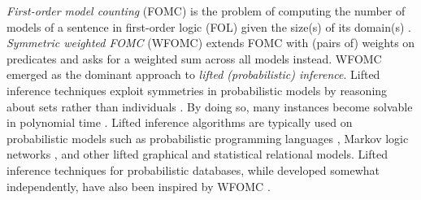 \documentclass[letterpaper]{article} %
\theoremstyle{definition}
\theoremstyle{remark}
\begin{document}
\emph{First-order model counting} (FOMC) is the problem of computing the number
of models of a sentence in first-order logic (FOL) given the size(s) of its
domain(s) \citep{DBLP:conf/pods/BeameBGS15}. \emph{Symmetric weighted FOMC}
(WFOMC) extends FOMC with (pairs of) weights on predicates and asks for a
weighted sum across all models instead. WFOMC emerged as the dominant approach
to \emph{lifted (probabilistic) inference}. Lifted inference techniques exploit
symmetries in probabilistic models by reasoning about sets rather than
individuals \citep{DBLP:conf/ecai/Kersting12}. By doing so, many instances
become solvable in polynomial time \citep{DBLP:conf/nips/Broeck11}. Lifted
inference algorithms are typically used on probabilistic models such as
probabilistic programming languages
\citep{DBLP:journals/ml/RaedtK15,DBLP:journals/ijar/RiguzziBZCL17}, Markov logic
networks
\citep{DBLP:conf/ijcai/BroeckTMDR11,DBLP:journals/cacm/GogateD16,DBLP:journals/ml/RichardsonD06},
and other lifted graphical \citep{DBLP:journals/ml/KimmigMG15} and statistical
relational \citep{DBLP:series/synthesis/2016Raedt} models. Lifted inference
techniques for probabilistic databases, while developed somewhat independently,
have also been inspired by WFOMC
\citep{DBLP:journals/pvldb/GatterbauerS15,DBLP:journals/debu/GribkoffSB14}.

\end{document}
